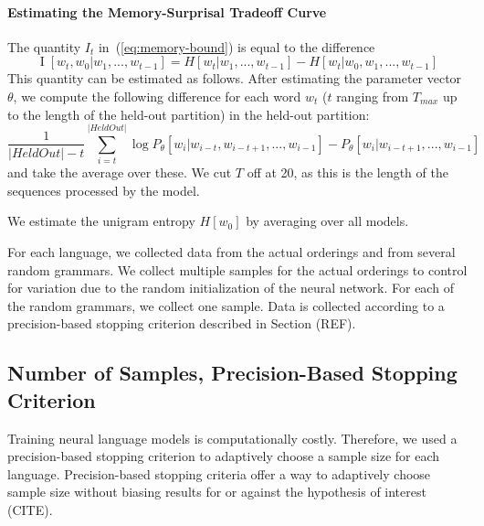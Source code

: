 \paragraph{Estimating the Memory-Surprisal Tradeoff Curve}
The quantity $I_t$ in~(\ref{eq:memory-bound}) is equal to the difference 
\begin{equation}
\operatorname{I}[w_t, w_0 | w_1, ..., w_{t-1}] = H[w_t|w_1, ..., w_{t-1}] - H[w_t|w_0, w_1, ..., w_{t-1}]
\end{equation}
This quantity can be estimated as follows.
After estimating the parameter vector $\theta$, we compute the following difference for each word $w_t$ ($t$ ranging from $T_{max}$ up to the length of the held-out partition) in the held-out partition:
\begin{equation}
	\frac{1}{|HeldOut|-t} \sum_{i=t}^{|HeldOut|} \log P_\theta[w_i | w_{i-t}, w_{i-t+1}, ..., w_{i-1}] - P_\theta[w_i | w_{i-t+1}, ..., w_{i-1}]
\end{equation}
and take the average over these.
We cut $T$ off at 20, as this is the length of the sequences processed by the model.


We estimate the unigram entropy $H[w_0]$ by averaging over all models.

For each language, we collected data from the actual orderings and from several random grammars.
We collect multiple samples for the actual orderings to control for variation due to the random initialization of the neural network.
For each of the random grammars, we collect one sample.
Data is collected according to a precision-based stopping criterion described in Section (REF).


\subsection{Number of Samples, Precision-Based Stopping Criterion}
Training neural language models is computationally costly.
Therefore, we used a precision-based stopping criterion to adaptively choose a sample size for each language.
Precision-based stopping criteria offer a way to adaptively choose sample size without biasing results for or against the hypothesis of interest (CITE).

